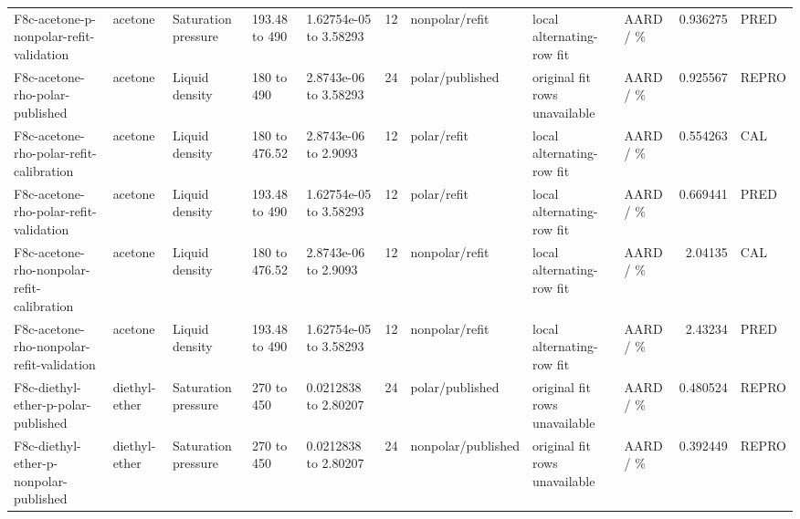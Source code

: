 \begin{landscape}
\begin{longtable}{L{1.9cm}L{2.5cm}L{2.1cm}L{1.6cm}L{1.6cm}rL{2.4cm}L{1.9cm}L{2.2cm}rL{1cm}}
F8c-\allowbreak{}acetone-\allowbreak{}p-\allowbreak{}nonpolar-\allowbreak{}refit-\allowbreak{}validation & acetone & Saturation pressure & 193.48 to 490 & 1.62754e-\allowbreak{}05 to 3.58293 & 12 & nonpolar/\allowbreak{}refit & local alternating-\allowbreak{}row fit & AARD /\allowbreak{} \% & 0.936275 & PRED \\
F8c-\allowbreak{}acetone-\allowbreak{}rho-\allowbreak{}polar-\allowbreak{}published & acetone & Liquid density & 180 to 490 & 2.8743e-\allowbreak{}06 to 3.58293 & 24 & polar/\allowbreak{}published & original fit rows unavailable & AARD /\allowbreak{} \% & 0.925567 & REPRO \\
F8c-\allowbreak{}acetone-\allowbreak{}rho-\allowbreak{}polar-\allowbreak{}refit-\allowbreak{}calibration & acetone & Liquid density & 180 to 476.52 & 2.8743e-\allowbreak{}06 to 2.9093 & 12 & polar/\allowbreak{}refit & local alternating-\allowbreak{}row fit & AARD /\allowbreak{} \% & 0.554263 & CAL \\
F8c-\allowbreak{}acetone-\allowbreak{}rho-\allowbreak{}polar-\allowbreak{}refit-\allowbreak{}validation & acetone & Liquid density & 193.48 to 490 & 1.62754e-\allowbreak{}05 to 3.58293 & 12 & polar/\allowbreak{}refit & local alternating-\allowbreak{}row fit & AARD /\allowbreak{} \% & 0.669441 & PRED \\
F8c-\allowbreak{}acetone-\allowbreak{}rho-\allowbreak{}nonpolar-\allowbreak{}refit-\allowbreak{}calibration & acetone & Liquid density & 180 to 476.52 & 2.8743e-\allowbreak{}06 to 2.9093 & 12 & nonpolar/\allowbreak{}refit & local alternating-\allowbreak{}row fit & AARD /\allowbreak{} \% & 2.04135 & CAL \\
F8c-\allowbreak{}acetone-\allowbreak{}rho-\allowbreak{}nonpolar-\allowbreak{}refit-\allowbreak{}validation & acetone & Liquid density & 193.48 to 490 & 1.62754e-\allowbreak{}05 to 3.58293 & 12 & nonpolar/\allowbreak{}refit & local alternating-\allowbreak{}row fit & AARD /\allowbreak{} \% & 2.43234 & PRED \\
F8c-\allowbreak{}diethyl-\allowbreak{}ether-\allowbreak{}p-\allowbreak{}polar-\allowbreak{}published & diethyl-\allowbreak{}ether & Saturation pressure & 270 to 450 & 0.0212838 to 2.80207 & 24 & polar/\allowbreak{}published & original fit rows unavailable & AARD /\allowbreak{} \% & 0.480524 & REPRO \\
F8c-\allowbreak{}diethyl-\allowbreak{}ether-\allowbreak{}p-\allowbreak{}nonpolar-\allowbreak{}published & diethyl-\allowbreak{}ether & Saturation pressure & 270 to 450 & 0.0212838 to 2.80207 & 24 & nonpolar/\allowbreak{}published & original fit rows unavailable & AARD /\allowbreak{} \% & 0.392449 & REPRO \\

\end{longtable}
\end{landscape}
